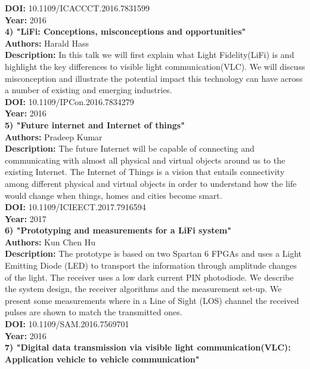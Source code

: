 \documentclass[12pt,a4paper]
{article}
\numberwithin{table}{section}
\begin{document}
{{\textbf{DOI: }10.1109/ICACCCT.2016.7831599\\
\textbf{Year: }2016\\
\newline \textbf{4)  "LiFi: Conceptions, misconceptions and opportunities"}\\
\textbf{Authors: }Harald Hass\\
\textbf{Description: }In this talk we will first explain what Light Fidelity(LiFi) is and highlight the key differences to visible light communication(VLC). We will discuss misconception and illustrate the potential impact this technology can have across a number of existing and emerging industries.\\
\textbf{DOI: }10.1109/IPCon.2016.7834279\\
\textbf{Year: }2016\\
\newline \textbf{5)  "Future internet and Internet of things"}\\
\textbf{Authors: }Pradeep Kumar\\
\textbf{Description: }The future Internet will be capable of connecting and communicating with almost all physical and virtual objects around us to the existing Internet. The Internet of Things is a vision that entails connectivity among different physical and virtual objects in order to understand how the life would change when things, homes and cities become smart.\\
\textbf{DOI: }10.1109/ICIEECT.2017.7916594\\
\textbf{Year: }2017\\
\newline \textbf{6) "Prototyping and measurements for a LiFi system"}\\
\textbf{Authors: }Kun Chen Hu\\
\textbf{Description: }The prototype is based on two Spartan 6 FPGAs and uses a Light Emitting Diode (LED) to transport the information through amplitude changes of the light. The receiver uses a low dark current PIN photodiode. We describe the system design, the receiver algorithms and the measurement set-up. We present some measurements where in a Line of Sight (LOS) channel the received pulses are shown to match the transmitted ones.\\
\textbf{DOI: }10.1109/SAM.2016.7569701\\
\textbf{Year: }2016\\
\newline \textbf{7) "Digital data transmission via visible light communication(VLC): Application vehicle to vehicle communication"}\\
}}
\end{document}
